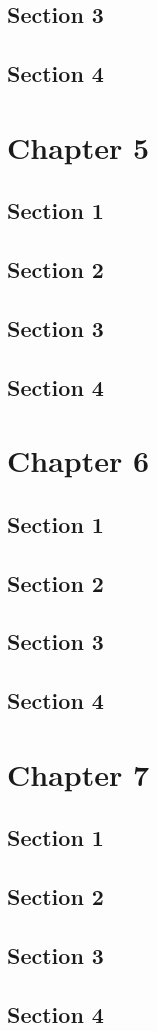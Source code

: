 \documentclass{SPhDThesis}
\begin{document}
		\section{Section 3}
		\section{Section 4}
	\chapter{Chapter 5}
		\section{Section 1}
		\section{Section 2}
		\section{Section 3}
		\section{Section 4}
	\chapter{Chapter 6}
		\section{Section 1}
		\section{Section 2}
		\section{Section 3}
		\section{Section 4}
	\chapter{Chapter 7}
		\section{Section 1}
		\section{Section 2}
		\section{Section 3}
		\section{Section 4}
\end{document}
